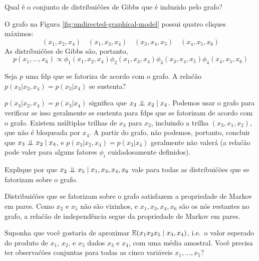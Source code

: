 \begin{exenumerate}
    
    
    \item Qual \'e o conjunto de distribui\'c\~oes de Gibbs que \'e induzido pelo grafo?
    
    \begin{solution}
        O grafo na Figura \ref{fig:undirected-graphical-model} possui quatro cliques m\'aximos:
        $$(x_1,x_2,x_4) \quad (x_1,x_3,x_4) \quad (x_3,x_4,x_5) \quad (x_4, x_5, x_6)$$
        As distribui\'c\~oes de Gibbs s\~ao, portanto,
        $$p(x_1,\ldots,x_6) \propto \phi_1(x_1,x_2,x_4) \phi_2(x_1,x_3,x_4) \phi_3(x_3,x_4,x_5) \phi_4(x_4, x_5, x_6)$$
    \end{solution}
    
    \item Seja $p$ uma fdp que se fatoriza de acordo com o grafo. A rela\'c\~ao $p(x_3 | x_2, x_4) = p(x_3 | x_4)$ se sustenta?
    
    \begin{solution}
        $p(x_3 | x_2, x_4) = p(x_3 | x_4)$ significa que $x_3 \mathrel{\perp\mspace{-10mu}\perp}
        x_2 \mid x_4$. Podemos usar o grafo para verificar se isso
        geralmente se sustenta para fdps que se fatorizam de acordo com o
        grafo. Existem m\'ultiplas trilhas de $x_3$ para $x_2$, incluindo
        a trilha $(x_3,x_1,x_2)$, que n\~ao \'e bloqueada por $x_4$. A partir do
        grafo, n\~ao podemos, portanto, concluir que $x_3 \mathrel{\perp\mspace{-10mu}\perp} x_2 \mid x_4$,
        e $p(x_3 | x_2, x_4) = p(x_3 | x_4)$ geralmente n\~ao valer\'a
        (a rela\'c\~ao pode valer para alguns fatores $\phi_i$ cuidadosamente definidos).
        
    \end{solution}
    
    \item Explique por que $x_2 \mathrel{\perp\mspace{-10mu}\perp} x_5 \mid x_1,x_3,x_4,x_6$ vale para todas as distribui\'c\~oes que se fatorizam sobre o grafo.
    
    \begin{solution}
        Distribui\'c\~oes que se fatorizam sobre o grafo satisfazem a propriedade de Markov em pares. Como $x_2$ e $x_5$ n\~ao s\~ao vizinhos, e $x_1,x_3,x_4,x_6$
        s\~ao os n\'os restantes no grafo, a rela\'c\~ao de independ\^encia segue da propriedade de Markov em pares.
    \end{solution}
    
    \item Suponha que voc\^e gostaria de aproximar $\mathbb{E} (x_1 x_2 x_5 \mid
    x_3,x_4)$, i.e.\ o valor esperado do produto de $x_1$, $x_2$,
    e $x_5$ dados $x_3$ e $x_4$, com uma m\'edia amostral. Voc\^e
    precisa ter observa\'c\~oes conjuntas para todas as cinco vari\'aveis $x_1, \ldots, x_5$?
    

\end{exenumerate}
